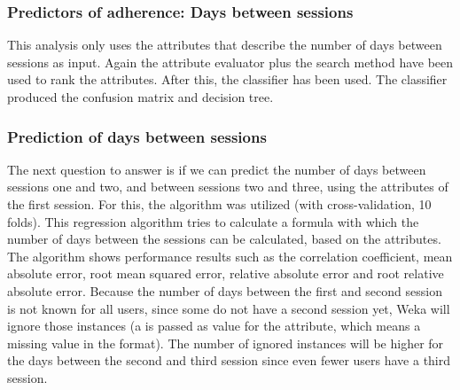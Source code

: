 \subsubsection{Predictors of adherence: Days between sessions}
This analysis only uses the attributes that describe the number of days between sessions as input. Again the  attribute evaluator plus the  search method have been used to rank the attributes. After this, the  classifier has been used. The classifier produced the confusion matrix and decision tree.

\subsubsection{Prediction of days between sessions}
The next question to answer is if we can predict the number of days between sessions one and two, and between sessions two and three, using the attributes of the first session. For this, the  algorithm was utilized (with cross-validation, 10 folds). This regression algorithm tries to calculate a formula with which the number of days between the sessions can be calculated, based on the attributes. The algorithm shows performance results such as the correlation coefficient, mean absolute error, root mean squared error, relative absolute error and root relative absolute error. Because the number of days between the first and second session is not known for all users, since some do not have a second session yet, Weka will ignore those instances (a  is passed as value for the attribute, which means a missing value in the  format). The number of ignored instances will be higher for the days between the second and third session since even fewer users have a third session.










